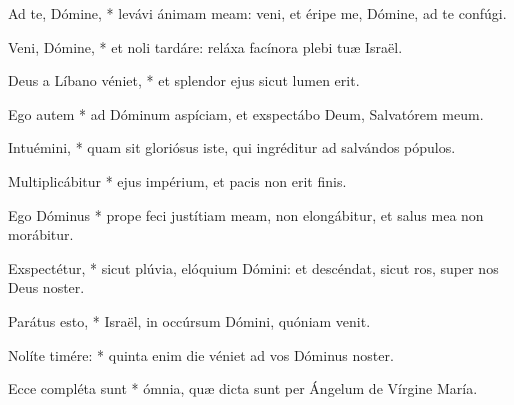 
 Ad te, Dómine, * levávi ánimam meam: veni, et éripe me, Dómine, ad te confúgi.

 Veni, Dómine, * et noli tardáre: reláxa facínora plebi tuæ Israël.

 Deus a Líbano véniet, * et splendor ejus sicut lumen erit.

 Ego autem * ad Dóminum aspíciam, et exspectábo Deum, Salvatórem meum.




 Intuémini, * quam sit gloriósus iste, qui ingréditur ad salvándos pópulos.


 Multiplicábitur * ejus impérium, et pacis non erit finis.

 Ego Dóminus * prope feci justítiam meam, non elongábitur, et salus mea non morábitur.

 Exspectétur, * sicut plúvia, elóquium Dómini: et descéndat, sicut ros, super nos Deus noster.

 Parátus esto, * Israël, in occúrsum Dómini, quóniam venit.



 Nolíte timére: * quinta enim die véniet ad vos Dóminus noster.



 Ecce compléta sunt * ómnia, quæ dicta sunt per Ángelum de Vírgine María.


\sectionornament



